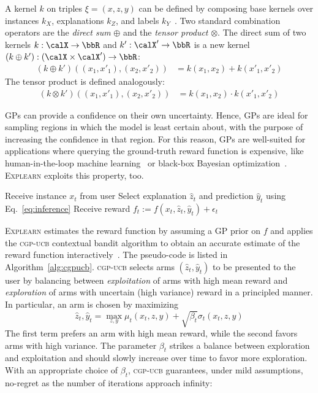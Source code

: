 \documentclass[letterpaper]{article} %
\newcommand{\explearn}{\textsc{Explearn}\xspace}
\newcommand{\cgpucb}{\textsc{cgp-ucb}\xspace}
\begin{document}
A kernel $k$ on triples $\xi = (x, z, y)$ can be defined by composing base kernels over instances $k_X$, explanations $k_Z$, and labels $k_Y$~\cite{krause2011contextual}.  Two standard combination operators are the \emph{direct sum} $\oplus$ and the \emph{tensor product} $\otimes$.  The direct sum of two kernels $k: \calX \to \bbR$ and $k': \calX' \to \bbR$ is a new kernel $(k \oplus k'): (\calX \times \calX') \to \bbR$:
%
\begin{align}
    (k \oplus k')((x_1, x'_1), (x_2, x'_2))
        & = k(x_1,x_2) + k(x'_1, x'_2)
        \label{eq:kernelsum}
\end{align}
%
The tensor product is defined analogously:
%
\begin{align}
    (k \otimes k')((x_1, x'_1), (x_2, x'_2))
        & = k(x_1,x_2) \cdot k(x'_1, x'_2)
    \label{eq:kernelprod}
\end{align}

GPs can provide a confidence on their own uncertainty. Hence, GPs are ideal for sampling regions in which the model is least certain about, with the purpose of increasing the confidence in that region. For this reason, GPs are well-suited for applications where querying the ground-truth reward function is expensive, like human-in-the-loop machine learning~\cite{guo2010gaussian} or black-box Bayesian optimization~\cite{thornton2013auto}.  \explearn exploits this property, too.

\begin{algorithm}[t]
    \caption{The \explearn algorithm}
    \label{alg:cgpucb}
    \begin{algorithmic}[1]
            \State Receive instance $x_t$ from user
            \State Select explanation $\hat{z}_t$ and prediction $\hat{y}_t$ using Eq.~\ref{eq:inference} \label{eq:play}
            \State Receive reward $f_t := f(x_t, \hat{z}_t, \hat{y}_t) + \epsilon_t$
        \EndFor
    \end{algorithmic}
\end{algorithm}

\explearn estimates the reward function by assuming a GP prior on $f$ and applies the \cgpucb contextual bandit algorithm to obtain an accurate estimate of the reward function interactively~\cite{krause2011contextual}.  The pseudo-code is listed in Algorithm~\ref{alg:cgpucb}.  \cgpucb selects arms $(\hat{z}_t, \hat{y}_t)$ to be presented to the user by balancing between \emph{exploitation} of arms with high mean reward and \emph{exploration} of arms with uncertain (high variance) reward in a principled manner.  In particular, an arm is chosen by maximizing
\[
    \textstyle
    \hat{z}_t, \hat{y}_t = \max_{z, y} \mu_t(x_t, z, y) + \sqrt{\beta_t} \sigma_t(x_t, z, y)
    \label{eq:inference}
\]
%
The first term prefers an arm with high mean reward, while the second  favors arms with high variance. The parameter $\beta_t$ strikes a balance between exploration and exploitation and should slowly increase over time to favor more exploration. With an appropriate choice of $\beta_t$, \cgpucb guarantees, under mild assumptions, no-regret as the number of iterations approach infinity:
\end{document}
